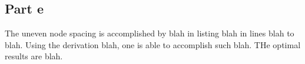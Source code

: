 \documentclass[11pt]{amsart}
\begin{document}
\subsection*{Part e}
The uneven node spacing is accomplished by blah in listing blah in lines blah to blah. Using the derivation blah, one is able to accomplish such blah. THe optimal results are blah.

\begin{landscape}
	
\end{landscape}
\begin{landscape}
	
\end{landscape}
\begin{landscape}
	
\end{landscape}
\begin{landscape}
	
\end{landscape}
\begin{landscape}
	
\end{landscape}
\end{document}
